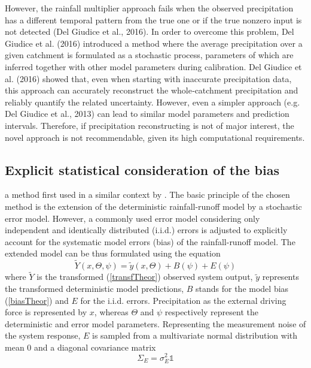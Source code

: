 \documentclass{ctuthesis}\usepackage[]{graphicx}\usepackage[]{color}
\begin{document}
However, the rainfall multiplier approach fails when the observed precipitation has a different
temporal pattern from the true one or if the true nonzero input is not detected (Del Giudice et al.,
2016). In order to overcome this problem, Del Giudice et al. (2016) introduced a method where the
average precipitation over a given catchment is formulated as a stochastic process, parameters of
which are inferred together with other model parameters during calibration. Del Giudice et al. (2016)
showed that, even when starting with inaccurate precipitation data, this approach can accurately
reconstruct the whole‐catchment precipitation and reliably quantify the related uncertainty.
However, even a simpler approach (e.g. Del Giudice et al., 2013) can lead to similar model
parameters and prediction intervals. Therefore, if precipitation reconstructing is not of major
interest, the novel approach is not recommendable, given its high computational requirements.


\subsection{Explicit statistical consideration of the bias} \label{delGiudTheor}

 a method first used in a similar context by \cite{giudice2013improving}. The basic principle of the chosen method is the extension of the deterministic rainfall-runoff model by a stochastic error model. However, a commonly used error model considering only independent and identically distributed (i.i.d.) errors is adjusted to explicitly account for the systematic model errors (bias) of the rainfall-runoff model. The extended model can be thus formulated using the equation
\begin{equation}
\tilde{Y} (x,\Theta, \psi) = \tilde{y} (x, \Theta) + B (\psi) + E (\psi)
\end{equation}
where $\tilde{Y}$ is the transformed (\ref{transfTheor}) observed system output, $\tilde{y}$ represents the transformed deterministic model predictions, $B$ stands for the  model bias (\ref{biasTheor}) and $E$ for the i.i.d. errors. Precipitation as the external driving force is represented by $x$, whereas $\Theta$ and $\psi$ respectively represent the deterministic and error model parameters. Representing the measurement noise of the system response, $E$ is sampled from a multivariate normal distribution with mean 0 and a diagonal covariance matrix
\begin{equation}
\Sigma_E= \sigma_E^2 \mathds{1}
\end{equation}
\end{document}
